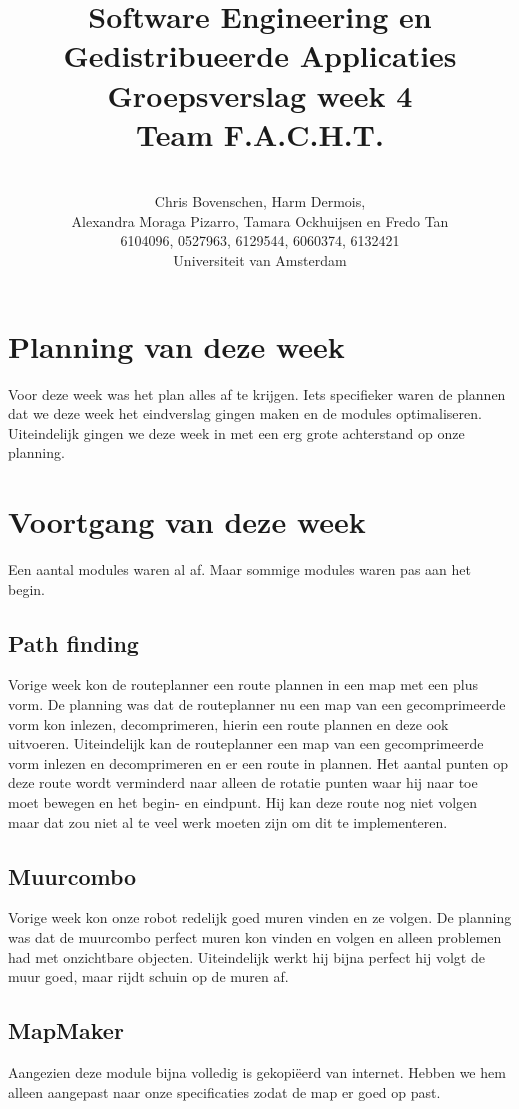 \documentclass[a4paper,10pt]{article}
\title{Software Engineering en Gedistribueerde Applicaties \\[10pt]Groepsverslag week 4\\[25pt]Team F.A.C.H.T.}
\author{\\Chris Bovenschen, Harm Dermois, \\Alexandra Moraga Pizarro, Tamara Ockhuijsen en Fredo Tan \\[10pt]6104096, 0527963, 6129544, 6060374, 6132421 \\[25pt]Universiteit van Amsterdam}
\begin{document}
\maketitle
\newpage
\section{Planning van deze week}
Voor deze week was het plan alles af te krijgen. Iets specifieker waren de plannen dat we deze week het eindverslag gingen maken en de modules optimaliseren. Uiteindelijk gingen we deze week in met een erg grote achterstand op onze planning.

\section{Voortgang van deze week}
Een aantal modules waren al af. Maar sommige modules waren pas aan het begin.
\subsection{Path finding}
Vorige week kon de routeplanner een route plannen in een map met een plus vorm. De planning was dat de routeplanner nu een map van een gecomprimeerde vorm kon inlezen, decomprimeren, hierin een route plannen en deze ook uitvoeren. Uiteindelijk kan de routeplanner een map van een gecomprimeerde vorm inlezen en decomprimeren en er een route in plannen. Het aantal punten op deze route wordt verminderd naar alleen de rotatie punten waar hij naar toe moet bewegen en het begin- en eindpunt. Hij kan deze route nog niet volgen maar dat zou niet al te veel werk moeten zijn om dit te implementeren.

\subsection{Muurcombo}
Vorige week kon onze robot redelijk goed muren vinden en ze volgen. De planning was dat de muurcombo perfect muren kon vinden en volgen en alleen problemen had met onzichtbare objecten. Uiteindelijk werkt hij bijna perfect hij volgt de muur goed, maar rijdt schuin op de muren af.

\subsection{MapMaker}
Aangezien deze module bijna volledig is gekopi\"{e}erd van internet. Hebben we hem alleen aangepast naar onze specificaties zodat de map er goed op past.
\end{document}
